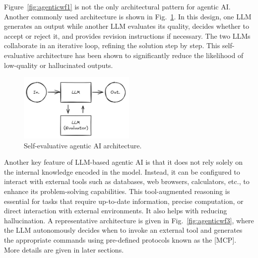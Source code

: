 Figure~\ref{fig:agenticwf1} is not the only architectural pattern for agentic AI. Another commonly used architecture is shown in Fig.~\ref{fig:agenticwf2}. In this design, one LLM generates an output while another LLM evaluates its quality, decides whether to accept or reject it, and provides revision instructions if necessary. The two LLMs collaborate in an iterative loop, refining the solution step by step. This self-evaluative architecture has been shown to significantly reduce the likelihood of low-quality or hallucinated outputs.

\begin{figure}[!htb]
	\centering
	\includegraphics[width=0.5\textwidth]{./chapters/part-7/figures/agenticaiworkflow2.png}
	\caption{Self-evaluative agentic AI architecture.}
	\label{fig:agenticwf2}
\end{figure}

Another key feature of LLM-based agentic AI is that it does not rely solely on the internal knowledge encoded in the model. Instead, it can be configured to interact with external tools such as databases, web browsers, calculators, etc., to enhance its problem-solving capabilities. This tool-augmented reasoning is essential for tasks that require up-to-date information, precise computation, or direct interaction with external environments. It also helps with reducing hallucination. A representative architecture is given in Fig.~\ref{fig:agenticwf3}, where the LLM autonomously decides when to invoke an external tool and generates the appropriate commands using pre-defined protocols known as the [MCP]. More details are given in later sections.

